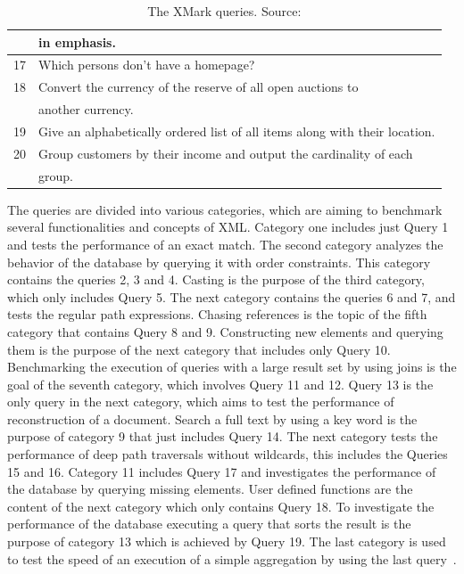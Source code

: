\begin {table}[htpb]
\begin{tabular}{r|l}
	  &in emphasis.\\
	  \hline
	  17&Which persons don't have a homepage?\\
	  \hline
	  18&Convert the currency of the reserve of all open auctions to\\
	  &another currency.\\
	  \hline
	  19&Give an alphabetically ordered list of all items along with their location.\\
	  \hline
	  20&Group customers by their income and output the cardinality of each\\
	  &group.\\
	  \hline
	\end{tabular}
	\caption {The XMark queries. Source:\cite{schmidtxmark}}
\label {tab:xmark-queries}
\end {table}


The queries are divided into various categories, which are aiming to benchmark several functionalities and concepts of XML.
Category one includes just Query 1 and tests the performance of an exact match.
The second category analyzes the behavior of the database by querying it with order constraints.
This category contains the queries 2, 3 and 4.
Casting is the purpose of the third category, which only includes Query 5.
The next category contains the queries 6 and 7, and tests the regular path expressions.
Chasing references is the topic of the fifth category that contains Query 8 and 9.
Constructing new elements and querying them is the purpose of the next category that includes only Query 10.
Benchmarking the execution of queries with a large result set by using joins is the goal of the seventh category, which involves Query 11 and 12.
Query 13 is the only query in the next category, which aims to test the performance of reconstruction of a document.
Search a full text by using a key word is the purpose of category 9 that just includes Query 14.
The next category tests the performance of deep path traversals without wildcards, this includes the Queries 15 and 16.
Category 11 includes Query 17 and investigates the performance of the database by querying missing elements.
User defined functions are the content of the next category which only contains Query 18.
To investigate the performance of the database executing a query that sorts the result is the purpose of category 13 which is achieved by Query 19.
The last category is used to test the speed of an execution of a simple aggregation by using the last query~\cite{schmidtxmark}.

